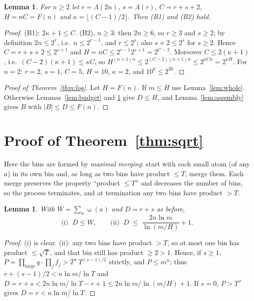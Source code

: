 \documentclass[11pt]{article}
\newtheorem{lemma}[theorem]{Lemma}
\theoremstyle{definition}
\newcommand{\Lam}{\Lambda}
\DeclareMathOperator{\om}{\omega}
\begin{document}
\begin{lemma}\label{lem:params}
For $n\ge 2$ let $r=\Lam(2n)$, $s=\Lam(r)$, $C=r+s+2$, $H=nC=F(n)$ and $\kappa=\lfloor(C-1)/2\rfloor$. Then
\textup{(B1)} and \textup{(B2)} hold.
\end{lemma}
\begin{proof}
(B1): $2\kappa+1\le C$. (B2), $n\ge 3$: then $2n\ge 6$, so $r\ge 3$ and $s\ge 2$; by definition $2n\le 2^r$,
i.e.\ $n\le 2^{r-1}$, and $r\le 2^s$; also $s+2\le 2^s$ for $s\ge 2$. Hence $C=r+s+2\le 2^{s+1}$ and
$H=nC\le 2^{r-1}2^{s+1}=2^{C-2}$. Moreover $C\le 2(\kappa+1)$, i.e.\ $(C-2)(\kappa+1)\le\kappa C$, so
$H^{(\kappa+1)n}\le 2^{(C-2)(\kappa+1)n}\le 2^{\kappa Cn}=2^{\kappa H}$. For $n=2$: $r=2$, $s=1$, $C=5$,
$H=10$, $\kappa=2$, and $10^6\le 2^{20}$.
\end{proof}

\begin{proof}[Proof of Theorem~\ref{thm:log}]
Let $H=F(n)$. If $m\le H$ use Lemma~\ref{lem:whole}. Otherwise Lemmas~\ref{lem:budget} and \ref{lem:params}
give $D\le H$, and Lemma~\ref{lem:assembly} gives $B$ with $|B|\le D\le F(n)$.
\end{proof}

\section{Proof of Theorem~\ref{thm:sqrt}}\label{sec:sqrt}

Here the bins are formed by \emph{maximal merging}: start with each small atom (of any $a$) in its own bin
and, as long as two bins have product $\le T$, merge them. Each merge preserves the property ``product
$\le T$'' and decreases the number of bins, so the process terminates, and at termination any two bins have
product $>T$.

\begin{lemma}\label{lem:K}
With $W=\sum_a\om(a)$ and $D=r+s$ as before,
\[
 \text{(i)}\;\; D\le W,\qquad
 \text{(ii)}\;\; D\;\le\;\frac{2n\ln m}{\ln(m/H)}+1 .
\]
\end{lemma}
\begin{proof}
(i) is clear. (ii): any two bins have product $>T$, so at most one bin has product $\le\sqrt T$, and that bin still has
product $\ge 2>1$. Hence, if $s\ge 1$, $P=\prod_{\text{large}}q\cdot\prod_j f_j>T^{\,r}\,T^{(s-1)/2}$ strictly, and
$P\le m^n$; thus
$r+(s-1)/2<n\ln m/\ln T$ and $D=r+s<2n\ln m/\ln T-r+1\le 2n\ln m/\ln(m/H)+1$. If $s=0$, $P>T^{\,r}$ gives
$D=r<n\ln m/\ln T$.
\end{proof}
\end{document}
